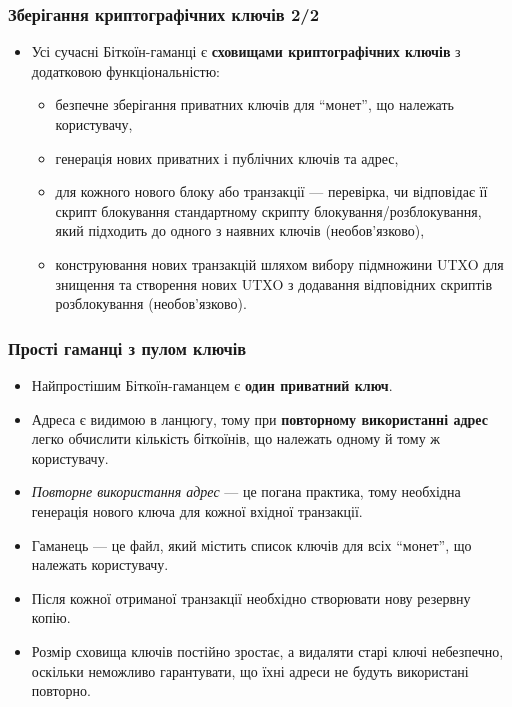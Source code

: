 \documentclass{beamer}
\begin{document}
\begin{frame}
  \frametitle{Зберігання криптографічних ключів 2/2}
  \begin{itemize}
  \item Усі сучасні Біткоїн-гаманці є \textbf{сховищами криптографічних ключів}
    з додатковою функціональністю:
    \begin{itemize}
    \item безпечне зберігання приватних ключів для ``монет'', що належать
      користувачу,
    \item генерація нових приватних і публічних ключів та адрес,
    \item для кожного нового блоку або транзакції — перевірка, чи відповідає її
      скрипт блокування стандартному скрипту блокування/розблокування, який
      підходить до одного з наявних ключів (необов'язково),
    \item конструювання нових транзакцій шляхом вибору підмножини UTXO для
      знищення та створення нових UTXO з додавання відповідних скриптів
      розблокування (необов'язково).
    \end{itemize}
  \end{itemize}
\end{frame}

\begin{frame}
  \frametitle{Прості гаманці з пулом ключів}
  \begin{itemize}
  \item Найпростішим Біткоїн-гаманцем є \textbf{один приватний ключ}.
  \item Адреса є видимою в ланцюгу, тому при \textbf{повторному використанні
      адрес} легко обчислити кількість біткоїнів, що належать одному й тому ж
    користувачу.
  \item \textit{Повторне використання адрес} — це погана практика, тому
    необхідна генерація нового ключа для кожної вхідної транзакції.
  \item Гаманець — це файл, який містить список ключів для всіх ``монет'', що
    належать користувачу.
  \item Після кожної отриманої транзакції необхідно створювати нову резервну
    копію.
  \item Розмір сховища ключів постійно зростає, а видаляти старі ключі
    небезпечно, оскільки неможливо гарантувати, що їхні адреси не будуть
    використані повторно.
  \end{itemize}
\end{frame}
\end{document}
